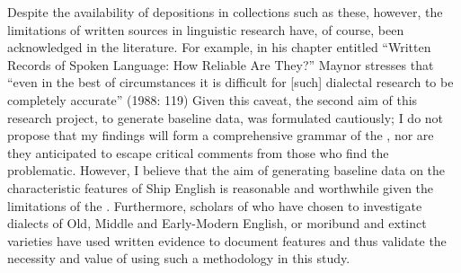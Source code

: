 Despite the availability of depositions in collections such as these, however, the limitations of written sources in linguistic research have, of course, been acknowledged in the literature. For example, in his chapter entitled “Written Records of Spoken Language: How Reliable Are They?” Maynor stresses that “even in the best of circumstances it is difficult for [such] dialectal research to be completely accurate” (1988: 119) Given this caveat, the second aim of this research project, to generate baseline data, was formulated cautiously; I do not propose that my findings will form a comprehensive grammar of the , nor are they anticipated to escape critical comments from those who find the  problematic. However, I believe that the aim of generating baseline data on the characteristic features of Ship English is reasonable and worthwhile given the limitations of the . Furthermore, scholars of  who have chosen to investigate dialects of Old, Middle and Early-Modern English, or moribund and extinct varieties have used written evidence to document features and thus validate the necessity and value of using such a methodology in this study. 

